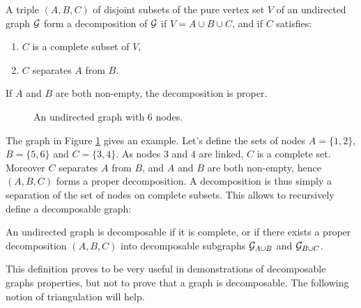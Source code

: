  \begin{definition}
 A triple $(A, B, C)$ of disjoint subsets of the pure vertex set $V$ of an undirected graph $\mathcal{G}$ form a decomposition of $\mathcal{G}$ if $V=A\cup B \cup C$, and if $C$ satisfies:
 \begin{enumerate}[label=(\roman*)]
 \item $C$ is a complete subset of  $V$,
 \item $C$ separates $A$ from $B$.
 \end{enumerate}
 If $A$ and $B$ are both non-empty, the decomposition is proper.
 \end{definition}
 \begin{figure}[H]
 \begin{center}
 \caption{An undirected graph with 6 nodes.}
  \label{ex:graph0}
    \end{center}
\end{figure}
The graph in Figure \ref{ex:graph0} gives an example. Let's define the sets of nodes $A=\{1,2\}$, $B=\{5,6\}$ and $C=\{3,4\}$. As nodes $3$ and $4$ are linked, $C$ is a complete set. Moreover $C$ separates $A$ from $B$, and $A$ and $B$ are both non-empty, hence $(A, B, C)$  forms a proper decomposition. A decomposition is thus simply a separation of the set of nodes on complete subsets. This allows to recursively define a decomposable graph:
 \begin{definition}
 An undirected graph is decomposable if it is complete, or if there exists a proper decomposition $(A, B, C)$ into decomposable subgraphs $\mathcal{G}_{A\cup B}$ and $\mathcal{G}_{B\cup C}$.
 \end{definition}
 This definition proves to be very useful in demonstrations of decomposable graphs properties, but not to prove that a graph is decomposable. The following notion of triangulation will help.
 
